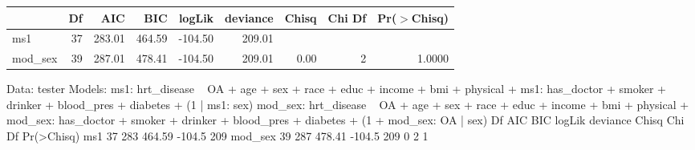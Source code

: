 \begin{table}[ht]
\centering
\begin{tabular}{lrrrrrrrr}
  \hline
 & Df & AIC & BIC & logLik & deviance & Chisq & Chi Df & Pr($>$Chisq) \\ 
  \hline
ms1 & 37 & 283.01 & 464.59 & -104.50 & 209.01 &  &  &  \\ 
  mod\_sex & 39 & 287.01 & 478.41 & -104.50 & 209.01 & 0.00 & 2 & 1.0000 \\ 
   \hline
\end{tabular}
\end{table}
Data: tester
Models:
ms1: hrt_disease ~ OA + age + sex + race + educ + income + bmi + physical + 
ms1:     has_doctor + smoker + drinker + blood_pres + diabetes + (1 | 
ms1:     sex)
mod_sex: hrt_disease ~ OA + age + sex + race + educ + income + bmi + physical + 
mod_sex:     has_doctor + smoker + drinker + blood_pres + diabetes + (1 + 
mod_sex:     OA | sex)
        Df AIC    BIC logLik deviance Chisq Chi Df Pr(>Chisq)
ms1     37 283 464.59 -104.5      209                        
mod_sex 39 287 478.41 -104.5      209     0      2          1
